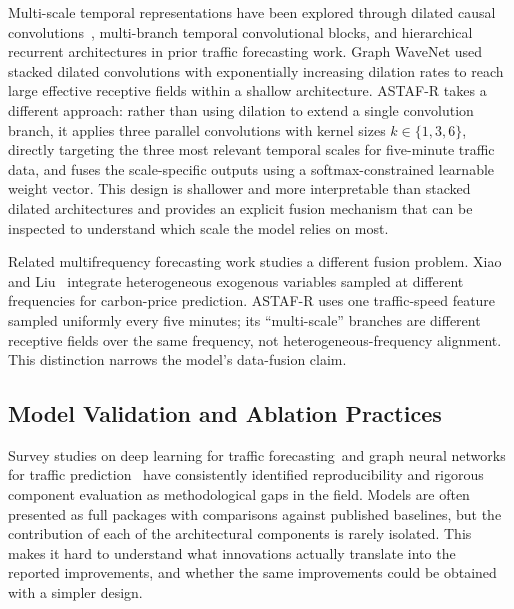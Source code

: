 \documentclass[fleqn,10pt]{wlscirep}
\newenvironment{changedcontent}{\color{changeblue}}{}
\begin{document}
Multi-scale temporal representations have been explored through
dilated causal convolutions~\cite{wu2019graphwavenet}, multi-branch
temporal convolutional blocks, and hierarchical recurrent
architectures in prior traffic forecasting work. Graph WaveNet used
stacked dilated convolutions with exponentially increasing dilation
rates to reach large effective receptive fields within a shallow
architecture. ASTAF-R takes a different approach: rather than using
dilation to extend a single convolution branch, it applies three
parallel convolutions with kernel sizes $k \in \{1, 3, 6\}$,
directly targeting the three most relevant temporal scales for
five-minute traffic data, and fuses the scale-specific outputs using
a softmax-constrained learnable weight vector. This design is
shallower and more interpretable than stacked dilated architectures
and provides an explicit fusion mechanism that can be inspected
to understand which scale the model relies on most.

\begin{changedcontent}
Related multifrequency forecasting work studies a different fusion problem.
Xiao and Liu~\cite{xiao2025multifrequency} integrate heterogeneous exogenous
variables sampled at different frequencies for carbon-price prediction.
ASTAF-R uses one traffic-speed feature sampled uniformly every five minutes;
its ``multi-scale'' branches are different receptive fields over the same
frequency, not heterogeneous-frequency alignment. This distinction narrows
the model's data-fusion claim.
\end{changedcontent}

\subsection{Model Validation and Ablation Practices}

Survey studies on deep learning for traffic forecasting~\cite{yin2022deeplearningtraffic}and graph neural networks for traffic prediction~\cite{jiang2022gnnsurvey} have consistently identified reproducibility and rigorous component evaluation as methodological gaps in the field. Models are often presented as full packages with comparisons against published baselines, but the contribution of each of the architectural components is rarely isolated. This makes it hard to understand what innovations actually translate into the reported improvements, and whether the same improvements could be obtained with a simpler design.
\end{document}
